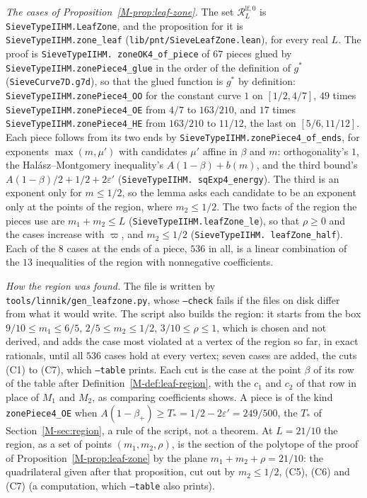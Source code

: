 \documentclass[11pt]{article}
\newcommand{\lean}[1]{\texttt{#1}}
\newcommand{\file}[1]{\nolinkurl{#1}}
\numberwithin{equation}{section}
\begin{document}
\emph{The cases of Proposition~\ref{M-prop:leaf-zone}.} The set $\mathcal R^{\mathrm{lf},0}_L$ is
\lean{SieveTypeIIHM.\allowbreak LeafZone}, and the proposition for it is \lean{SieveTypeIIHM.\allowbreak zone\_leaf}
(\file{lib/pnt/SieveLeafZone.lean}), for every real $L$. The proof is \lean{SieveTypeIIHM.\allowbreak
zoneOK4\_of\_piece} of $67$ pieces glued by \lean{SieveTypeIIHM.\allowbreak zonePiece4\_glue} in the order of the
definition of $g^*$ (\lean{SieveCurve7D.\allowbreak g7d}), so that the glued function is $g^*$ by definition:
\lean{SieveTypeIIHM.\allowbreak zonePiece4\_OO} for the constant curve $1$ on $[1/2, 4/7]$, $49$ times
\lean{SieveTypeIIHM.\allowbreak zonePiece4\_OE} from $4/7$ to $163/210$, and $17$ times
\lean{SieveTypeIIHM.\allowbreak zonePiece4\_HE} from $163/210$ to $11/12$, the last on $[5/6, 11/12]$. Each piece
follows from its two ends by \lean{SieveTypeIIHM.\allowbreak zonePiece4\_of\_ends}, for exponents $\max(m, \mu')$
with candidates $\mu'$ affine in $\beta$ and $m$: orthogonality's $1$, the Hal\'asz--Montgomery inequality's $A(1 -
\beta) + b(m)$, and the third bound's $A(1 - \beta)/2 + 1/2 + 2\varepsilon'$ (\lean{SieveTypeIIHM.\allowbreak
sqExp4\_energy}). The third is an exponent only for $m \le 1/2$, so the lemma asks each candidate to be an exponent
only at the points of the region, where $m_2 \le 1/2$. The
two facts of the region the pieces use are $m_1 + m_2 \le L$ (\lean{SieveTypeIIHM.\allowbreak leafZone\_le}), so that
$\rho \ge 0$ and the cases increase with $\varpi$, and $m_2 \le 1/2$ (\lean{SieveTypeIIHM.\allowbreak
leafZone\_half}). Each of the $8$ cases at the ends of a piece, $536$ in all, is a linear combination of the $13$
inequalities of the region with nonnegative coefficients.

\emph{How the region was found.} The file is written by \file{tools/linnik/gen\_leafzone.py}, whose \texttt{--check}
fails if the files on disk differ from what it would write. The script also builds the region: it starts from the box
$9/10 \le m_1 \le 6/5$, $2/5 \le m_2 \le 1/2$, $3/10 \le \rho \le 1$, which is chosen and not derived, and adds the
case most violated at a vertex of the region so far, in exact rationals, until all $536$ cases hold at every vertex;
seven cases are added, the cuts (C1) to (C7), which \texttt{--table} prints. Each cut is the case at the point $\beta$
of its row of the table after Definition~\ref{M-def:leaf-region}, with the $c_1$ and $c_2$ of that row in place of $M_1$
and $M_2$, as comparing coefficients shows. A piece is of the kind \lean{zonePiece4\_OE} when $A(1 - \beta_+) \ge T_* =
1/2 - 2\varepsilon' = 249/500$, the $T_*$ of Section~\ref{M-sec:region}, a rule of the script, not a
theorem. At $L = 21/10$ the region, as a set of points $(m_1, m_2, \rho)$, is the section of the polytope of the proof
of Proposition~\ref{M-prop:leaf-zone} by the plane $m_1 + m_2 + \rho = 21/10$: the quadrilateral given after that
proposition, cut out by $m_2 \le 1/2$, (C5), (C6) and (C7) (a computation, which \texttt{--table} also prints).
\end{document}
